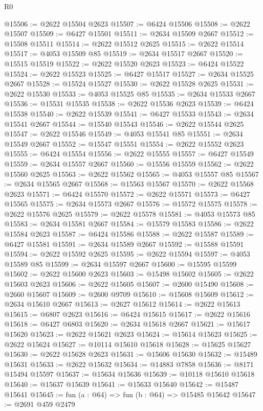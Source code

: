 \begin{lexlean}{R0}
\begin{coremodule}
@15506 := @2622 @15504 @2623
@15507 := @6424 @15506
@15508 := @2622 @15507
@15509 := @6427 @15501
@15511 := @2634 @15509 @2667
@15512 := @15508 @15511
@15514 := @2622 @15512 @2625
@15515 := @2622 @15514
@15517 := @4053 @15509 @85
@15519 := @2634 @15517 @2667
@15520 := @15515 @15519
@15522 := @2622 @15520 @2623
@15523 := @6424 @15522
@15524 := @2622 @15523
@15525 := @6427 @15517
@15527 := @2634 @15525 @2667
@15528 := @15524 @15527
@15530 := @2622 @15528 @2625
@15531 := @2622 @15530
@15533 := @4053 @15525 @85
@15535 := @2634 @15533 @2667
@15536 := @15531 @15535
@15538 := @2622 @15536 @2623
@15539 := @6424 @15538
@15540 := @2622 @15539
@15541 := @6427 @15533
@15543 := @2634 @15541 @2667
@15544 := @15540 @15543
@15546 := @2622 @15544 @2625
@15547 := @2622 @15546
@15549 := @4053 @15541 @85
@15551 := @2634 @15549 @2667
@15552 := @15547 @15551
@15554 := @2622 @15552 @2623
@15555 := @6424 @15554
@15556 := @2622 @15555
@15557 := @6427 @15549
@15559 := @2634 @15557 @2667
@15560 := @15556 @15559
@15562 := @2622 @15560 @2625
@15563 := @2622 @15562
@15565 := @4053 @15557 @85
@15567 := @2634 @15565 @2667
@15568 := @15563 @15567
@15570 := @2622 @15568 @2623
@15571 := @6424 @15570
@15572 := @2622 @15571
@15573 := @6427 @15565
@15575 := @2634 @15573 @2667
@15576 := @15572 @15575
@15578 := @2622 @15576 @2625
@15579 := @2622 @15578
@15581 := @4053 @15573 @85
@15583 := @2634 @15581 @2667
@15584 := @15579 @15583
@15586 := @2622 @15584 @2623
@15587 := @6424 @15586
@15588 := @2622 @15587
@15589 := @6427 @15581
@15591 := @2634 @15589 @2667
@15592 := @15588 @15591
@15594 := @2622 @15592 @2625
@15595 := @2622 @15594
@15597 := @4053 @15589 @85
@15599 := @2634 @15597 @2667
@15600 := @15595 @15599
@15602 := @2622 @15600 @2623
@15603 := @15498 @15602
@15605 := @2622 @15603 @2623
@15606 := @2622 @15605
@15607 := @2600 @15490
@15608 := @2660 @15607
@15609 := @2600 @9709
@15610 := @15608 @15609
@15612 := @2634 @15610 @2667
@15613 := @2627 @15612
@15614 := @2622 @15613
@15615 := @6807 @2623
@15616 := @6424 @15615
@15617 := @2622 @15616
@15618 := @6427 @6803
@15620 := @2634 @15618 @2667
@15621 := @15617 @15620
@15623 := @2622 @15621 @2623
@15624 := @15614 @15623
@15625 := @2622 @15624
@15627 := @10114 @15610 @15618
@15628 := @15625 @15627
@15630 := @2622 @15628 @2623
@15631 := @15606 @15630
@15632 := @15489 @15631
@15633 := @2622 @15632
@15634 := @14883 @7858
@15636 := @8171 @15494 @15597
@15637 := @15634 @15636
@15639 := @10118 @15610 @15618
@15640 := @15637 @15639
@15641 := @15633 @15640
@15642 := @15487 @15641
@15645 := fun (a : @64) => fun (b : @64) => @15485 @15642
@15647 := @2691 @459 @2479

\end{coremodule}
\end{lexlean}
